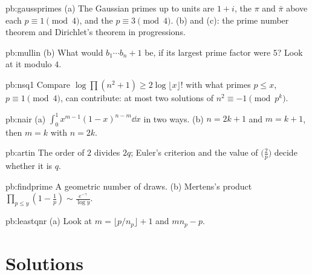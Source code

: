 \begin{hint}{pb:gaussprimes}
(a) The Gaussian primes up to units are $1+i$, the $\pi$ and $\bar\pi$ above each $p\equiv1\pmod4$, and the $p\equiv3\pmod4$. (b)
and (c): the prime number theorem and Dirichlet's theorem in progressions.
\end{hint}

\begin{hint}{pb:mullin}
(b) What would $b_1\cdots b_n+1$ be, if its largest prime factor were $5$? Look at it modulo $4$.
\end{hint}

\begin{hint}{pb:nsq1}
Compare $\log\prod(n^2+1)\ge2\log\lfloor x\rfloor!$ with what primes $p\le x$, $p\equiv1\pmod4$, can contribute: at most two
solutions of $n^2\equiv-1\pmod{p^k}$.
\end{hint}

\begin{hint}{pb:nair}
(a) $\int_0^1x^{m-1}(1-x)^{n-m}\dd x$ in two ways. (b) $n=2k+1$ and $m=k+1$, then $m=k$ with $n=2k$.
\end{hint}

\begin{hint}{pb:artin}
The order of $2$ divides $2q$; Euler's criterion and the value of $\bigl(\frac2p\bigr)$ decide whether it is $q$.
\end{hint}

\begin{hint}{pb:findprime}
A geometric number of draws. (b) Mertens's product $\prod_{p\le y}(1-\frac1p)\sim\frac{e^{-\gamma}}{\log y}$.
\end{hint}

\begin{hint}{pb:leastqnr}
(a) Look at $m=\lfloor p/n_p\rfloor+1$ and $mn_p-p$.
\end{hint}

\section{Solutions}

